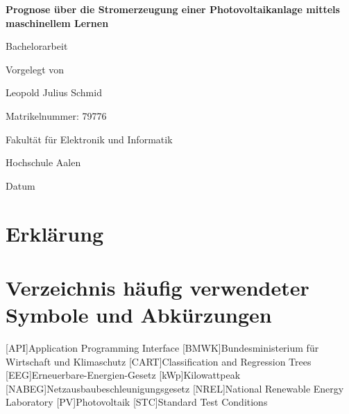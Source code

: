 \documentclass[12pt, a4paper]{article}
\begin{document}
\begin{titlepage}
    \begin{center}
        \vspace*{1cm}
        
        \textbf{\LARGE{Prognose über die Stromerzeugung einer Photovoltaikanlage mittels maschinellem Lernen}}
        
        \vspace{0.5cm}
        \Large{Bachelorarbeit}
        
        \vspace{1.5cm}
        \Large{Vorgelegt von}
        
        \vspace{0.5cm}
        \Large{Leopold Julius Schmid}
        
        \vspace{1.5cm}
        \Large{Matrikelnummer: 79776}
        
        \vfill
        
        \Large{Fakultät für Elektronik und Informatik}
        
        \vspace{0.5cm}
        \Large{Hochschule Aalen}
        
        \vspace{1.5cm}
        \Large{Datum}
        
    \end{center}
\end{titlepage}


\newpage

\section*{Erklärung}


\newpage


\section*{Verzeichnis häufig verwendeter Symbole und Abkürzungen}

\begin{acronym}
[API]{Application Programming Interface}
[BMWK]{Bundesministerium für Wirtschaft und Klimaschutz}
[CART]{Classification and Regression Trees}
[EEG]{Erneuerbare-Energien-Gesetz}
[kWp]{Kilowattpeak}
[NABEG]{Netzausbaubeschleunigungsgesetz}
[NREL]{National Renewable Energy Laboratory}
[PV]{Photovoltaik}
[STC]{Standard Test Conditions}
\end{acronym}
\end{document}
